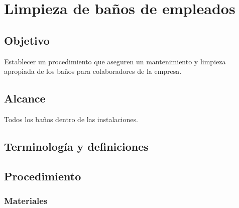\thispagestyle{formato-PI}
\renewcommand{\MenorVer}{0}
\renewcommand{\MayorVer}{2}
\renewcommand{\Codigo}{HYS-16-IT}
\renewcommand{\FechaPub}{2023--01}
\renewcommand{\Titulo}{Limpieza de baños de empleados}

\section{\Titulo}

\subsection{Objetivo}
Establecer un procedimiento que aseguren un mantenimiento y limpieza apropiada de los baños para colaboradores de la empresa.

\subsection{Alcance}

Todos los baños dentro de las instalaciones.

\subsection{Terminología y definiciones}

\begin{description}
\end{description}



\subsection{Procedimiento}

\subsubsection{Materiales}

